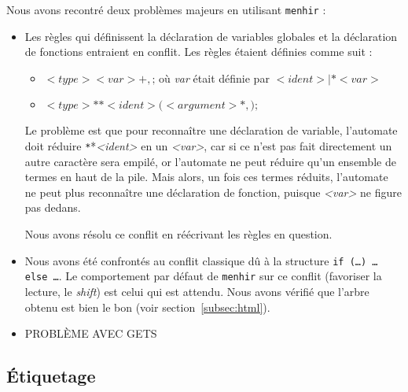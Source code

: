 \documentclass[a4paper]{article}
\begin{document}
Nous avons recontré deux problèmes majeurs en utilisant \texttt{menhir} :
\begin{itemize}
    \item Les règles qui définissent la déclaration de variables globales et la déclaration de fonctions entraient en conflit.
          Les règles étaient définies comme suit :
          \begin{itemize}
              \item $<type> <var>+,\texttt{;}$ où \emph{var} était définie par $<ident> | \texttt{*} <var>$
              \item $<type> \texttt{*}* <ident>\texttt{(} <argument>*, \texttt{);}$
          \end{itemize}
          Le problème est que pour reconnaître une déclaration de variable, l'automate doit réduire \texttt{*}*\emph{<ident>} en un \emph{<var>}, car si ce n'est pas fait directement un autre caractère sera empilé, or l'automate ne peut réduire qu'un ensemble de termes en haut de la pile. Mais alors, un fois ces termes réduits, l'automate ne peut plus reconnaître une déclaration de fonction, puisque \emph{<var>} ne figure pas dedans.

          Nous avons résolu ce conflit en réécrivant les règles en question.

      \item Nous avons été confrontés au conflit classique dû à la structure \texttt{if (…) … else …}.
            Le comportement par défaut de \texttt{menhir} sur ce conflit (favoriser la lecture, le \emph{shift}) est celui qui est attendu. Nous avons vérifié que l'arbre obtenu est bien le bon (voir section~\ref{subsec:html}).
      \item PROBLÈME AVEC GETS

\end{itemize}

\subsection{Étiquetage}
\end{document}
